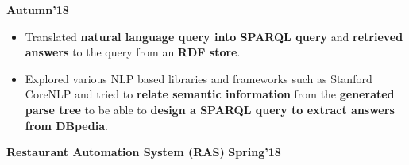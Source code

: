 \documentclass[10pt]{article}
\begin{document}
{\hfill} \textbf{Autumn'18}\\[-1.8em]
\begin{itemize}
    \item Translated \textbf{natural language query into SPARQL query} and \textbf{retrieved answers} to the query from an \textbf{RDF store}.\\[-2em]
    \item Explored various NLP based libraries and frameworks such as Stanford CoreNLP and tried to \textbf{relate semantic information} from the \textbf{generated parse tree} to be able to \textbf{design a SPARQL query to extract answers from DBpedia}.\\[-1em]
\end{itemize}
\iffalse
\fi
\iffalse
\fi
\large {\textbf{Restaurant Automation System (RAS)}} \normalsize \href{https://github.com/shmundhra/Restaurant-Automation-System}
{\hspace{0.5ex}\faMousePointer}
{\hfill} \textbf{Spring'18}\\[-1.8em]
\end{document}
